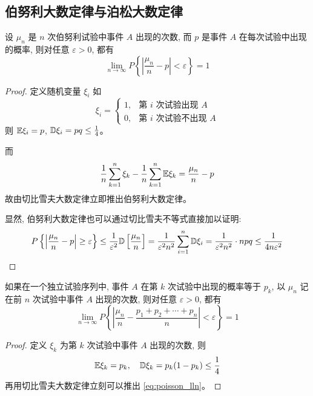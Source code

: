 \subsection{伯努利大数定律与泊松大数定律}\label{subsec:伯努利大数定律与泊松大数定律}
\begin{proposition}[伯努利大数定律]\label{prop:bernoulli_lln}
    设 $\mu_n$ 是 $n$ 次伯努利试验中事件 $A$ 出现的次数, 而 $p$ 是事件 $A$ 在每次试验中出现的概率, 则对任意 $\varepsilon>0$, 都有
\begin{equation} \label{eq:bernoulli_lln}
\lim_{n\to\infty} P\left\{ \left|\frac{\mu_n}{n}-p\right| < \varepsilon \right\} = 1
\end{equation}
\end{proposition}
\begin{proof}
    定义随机变量 $\xi_i$ 如
\begin{equation} \label{eq:xi_i_def}
\xi_i = \begin{cases}
1, & \text{第 } i \text{ 次试验出现 } A \\
0, & \text{第 } i \text{ 次试验不出现 } A
\end{cases}
\end{equation}
则 $\mathbb{E}\xi_i = p$, $\mathbb{D}\xi_i = pq \le \frac{1}{4}$。

而
\[
\frac{1}{n}\sum_{k=1}^n \xi_k - \frac{1}{n}\sum_{k=1}^n \mathbb{E}\xi_k = \frac{\mu_n}{n} - p
\]
故由切比雪夫大数定律立即推出伯努利大数定律。

显然, 伯努利大数定律也可以通过切比雪夫不等式直接加以证明:
\begin{equation} \label{eq:bernoulli_proof_chebyshev}
P\left\{ \left|\frac{\mu_n}{n}-p\right| \ge \varepsilon \right\} \le \frac{1}{\varepsilon^2}\mathbb{D}\left[\frac{\mu_n}{n}\right] = \frac{1}{\varepsilon^2 n^2}\sum_{i=1}^n \mathbb{D}\xi_i = \frac{1}{\varepsilon^2 n^2} \cdot n pq \le \frac{1}{4n\varepsilon^2}
\end{equation}
\end{proof}

\begin{proposition}[泊松大数定律]\label{prop:poisson_lln}
    如果在一个独立试验序列中, 事件 $A$ 在第 $k$ 次试验中出现的概率等于 $p_k$, 以 $\mu_n$ 记在前 $n$ 次试验中事件 $A$ 出现的次数, 则对任意 $\varepsilon>0$, 都有
\begin{equation} \label{eq:poisson_lln}
\lim_{n\to\infty} P\left\{ \left|\frac{\mu_n}{n} - \frac{p_1+p_2+\cdots+p_n}{n}\right| < \varepsilon \right\} = 1
\end{equation}
\end{proposition}
\begin{proof}
    定义 $\xi_k$ 为第 $k$ 次试验中事件 $A$ 出现的次数, 则
\[
\mathbb{E}\xi_k = p_k, \quad \mathbb{D}\xi_k = p_k(1-p_k) \le \frac{1}{4}
\]
再用切比雪夫大数定律立刻可以推出 \eqref{eq:poisson_lln}。
\end{proof}
